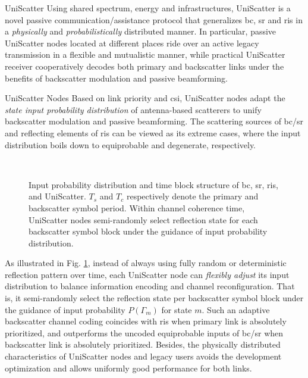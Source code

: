 \documentclass[journal]{IEEEtran}
\begin{document}
\begin{section}{UniScatter}
	Using shared spectrum, energy and infrastructures, UniScatter is a novel passive communication/assistance protocol that generalizes \gls{bc}, \gls{sr} and \gls{ris} in a \emph{physically} and \emph{probabilistically} distributed manner.
	In particular, passive UniScatter nodes located at different places ride over an active legacy transmission in a flexible and mutualistic manner, while practical UniScatter receiver cooperatively decodes both primary and backscatter links under the benefits of backscatter modulation and passive beamforming.
	\begin{subsection}{UniScatter Nodes}
		Based on link priority and \gls{csi}, UniScatter nodes adapt the \emph{state input probability distribution} of antenna-based scatterers to unify backscatter modulation and passive beamforming.
		The scattering sources of \gls{bc}/\gls{sr} and reflecting elements of \gls{ris} can be viewed as its extreme cases, where the input distribution boils down to equiprobable and degenerate, respectively.
		\begin{figure}[!t]
			\centering
			\\
			\caption{
				Input probability distribution and time block structure of \gls{bc}, \gls{sr}, \gls{ris}, and UniScatter.
				$T_s$ and $T_c$ respectively denote the primary and backscatter symbol period.
				Within channel coherence time, UniScatter nodes semi-randomly select reflection state for each backscatter symbol block under the guidance of input probability distribution.
			}
			\label{fi:uniscatter_distribution}
		\end{figure}
		As illustrated in Fig. \ref{fi:uniscatter_distribution}, instead of always using fully random or deterministic reflection pattern over time, each UniScatter node can \emph{flexibly adjust} its input distribution to balance information encoding and channel reconfiguration.
		That is, it semi-randomly select the reflection state per backscatter symbol block under the guidance of input probability $P(\Gamma_m)$ for state $m$.
		Such an adaptive backscatter channel coding coincides with \gls{ris} when primary link is absolutely prioritized, and outperforms the uncoded equiprobable inputs of \gls{bc}/\gls{sr} when backscatter link is absolutely prioritized.
		Besides, the physically distributed characteristics of UniScatter nodes and legacy users avoids the development optimization and allows uniformly good performance for both links.


\end{subsection}
\end{section}
\end{document}
